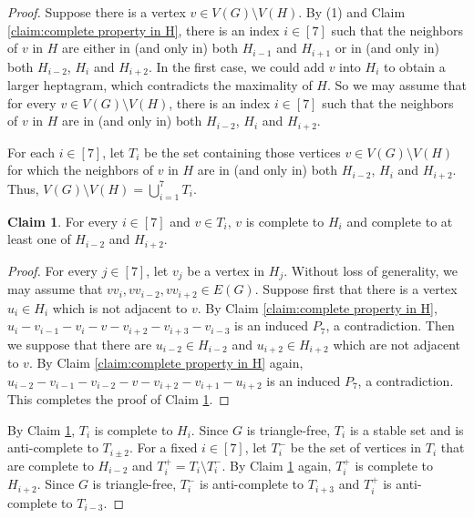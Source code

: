\documentclass[11pt,a4paper]{article}
\theoremstyle{definition}
\newtheorem{claim}{\indent Claim}
\begin{document}
\begin{proof}
    Suppose there is a vertex $v\in V(G)\setminus V(H)$. 
    By (1) and Claim \ref{claim:complete property in H}, there is an index $i\in[7]$ such that the neighbors of $v$ in $H$ are either in (and only in) both $H_{i-1}$ and $H_{i+1}$ or in (and only in) both $H_{i-2}$, $H_{i}$ and $H_{i+2}$. 
    In the first case, we could add $v$ into $H_i$ to obtain a larger heptagram, which contradicts the maximality of $H$. 
    So we may assume that for every $v\in V(G)\setminus V(H)$, there is an index $i\in[7]$ such that the neighbors of $v$ in $H$ are in (and only in) both $H_{i-2}$, $H_{i}$ and $H_{i+2}$. 
    
    For each $i\in [7]$, let $T_i$ be the set containing those vertices $v \in V(G)\setminus V(H)$ for which the neighbors of $v$ in $H$ are in (and only in) both $H_{i-2}$, $H_{i}$ and $H_{i+2}$. 
    Thus, $V(G)\setminus V(H)=\bigcup_{i=1}^7 T_i$. 

    \begin{claim}\label{claim:T_i property}
        For every $i\in [7]$ and $v\in T_i$, $v$ is complete to $H_i$ and complete to at least one of $H_{i-2}$ and $H_{i+2}$. 
    \end{claim}
    \begin{proof}
        For every $j\in [7]$, let $v_{j}$ be a vertex in $H_{j}$. 
        Without loss of generality, we may assume that $vv_i,vv_{i-2},vv_{i+2}\in E(G)$. 
        Suppose first that there is a vertex $u_i\in H_i$ which is not adjacent to $v$. 
        By Claim \ref{claim:complete property in H}, $u_i-v_{i-1}-v_{i}-v-v_{i+2}-v_{i+3}-v_{i-3}$ is an induced $P_7$, a contradiction. 
        Then we suppose that there are $u_{i-2}\in H_{i-2}$ and $u_{i+2}\in H_{i+2}$ which are not adjacent to $v$. 
        By Claim \ref{claim:complete property in H} again, $u_{i-2}-v_{i-1}-v_{i-2}-v-v_{i+2}-v_{i+1}-u_{i+2}$ is an induced $P_7$, a contradiction. 
        This completes the proof of Claim \ref{claim:T_i property}.
    \end{proof}



    

    By Claim \ref{claim:T_i property}, $T_i$ is complete to $H_i$. 
    Since $G$ is triangle-free, $T_i$ is a stable set and is anti-complete to $T_{i\pm 2}$. 
    For a fixed $i\in [7]$, let $T_i^-$ be the set of vertices in $T_i$ that are complete to $H_{i-2}$ and $T_i^+=T_i\setminus T_i^-$. 
    By Claim \ref{claim:T_i property} again, $T_i^+$ is complete to $H_{i+2}$. 
    Since $G$ is triangle-free, $T_i^-$ is anti-complete to $T_{i+3}$ and $T_i^+$ is anti-complete to $T_{i-3}$. 


\end{proof}
\end{document}
